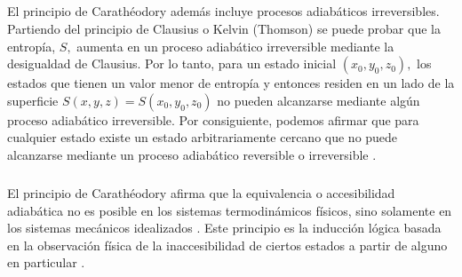 \documentclass{article}
\theoremstyle{definition} \newtheorem{defi}{Definici\'on}
\theoremstyle{definition} \newtheorem{teo}{Teorema}
\theoremstyle{definition} \newtheorem{cor}{Corolario}
\begin{document}
\subparagraph{}
El principio de Carath\'eodory adem\'as incluye procesos adiab\'aticos irreversibles. Partiendo del principio de Clausius o Kelvin (Thomson) se puede probar que la entrop\'ia, $S,$ aumenta en un proceso adiab\'atico irreversible mediante la desigualdad de Clausius. Por lo tanto, para un estado inicial $(x_0,y_0,z_0),$ los estados que tienen un valor menor de entrop\'ia y entonces residen en un lado de la superficie $S(x,y,z)=S(x_0,y_0,z_0)$ no pueden alcanzarse mediante alg\'un proceso adiab\'atico irreversible. Por consiguiente, podemos afirmar que para cualquier estado existe un estado arbitrariamente cercano que no puede alcanzarse mediante un proceso adiab\'atico reversible o irreversible \cite{KR}.
\subparagraph{}
El principio de Carath\'eodory afirma que la equivalencia o accesibilidad adiab\'atica no es posible en los sistemas termodin\'amicos f\'isicos, sino solamente en los sistemas mec\'anicos idealizados \cite{mt}. Este principio es la inducci\'on l\'ogica basada en la observaci\'on f\'isica de la inaccesibilidad de ciertos estados a partir de alguno en particular \cite{MB}.
\end{document}

